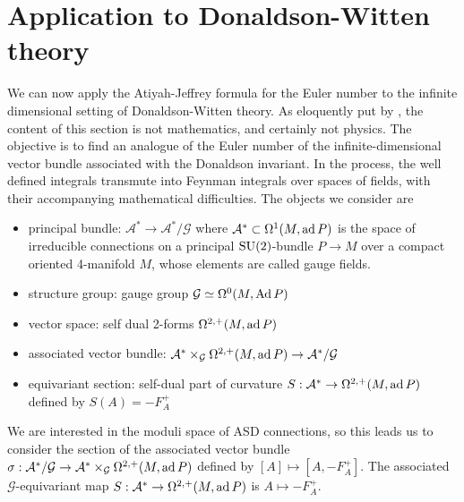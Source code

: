 \section{Application to Donaldson-Witten theory}
We can now apply the Atiyah-Jeffrey formula for the Euler number to the infinite 
dimensional setting of Donaldson-Witten theory. As eloquently put by \citet{naber},
the content of this section is not mathematics, and certainly not physics. The
objective is to find an analogue of the Euler number of the
infinite-dimensional vector bundle associated with the Donaldson invariant. In
the process, the well defined integrals transmute into Feynman integrals
over spaces of fields, with their accompanying mathematical difficulties.  
The objects we consider are 
\begin{itemize}
	\item principal bundle: $\mathcal{A}^* \to \mathcal{A}^* /\mathcal{G}$ where 
	$\mathcal{A}^* \subset \Omega^1(M,\operatorname{ad} P)$ is the
	space of irreducible connections   on a principal $\operatorname{SU}(2)$-bundle  $P\to M$
	over a compact oriented 4-manifold $M$, whose elements are called gauge
	fields.
	\item structure group: gauge group $\mathcal{G}\simeq \Omega^0(M,\operatorname{Ad} P)$
	\item vector space: self dual 2-forms $\Omega^{2,+}(M,\operatorname{ad} P)$ 
	\item associated vector bundle: $\mathcal{A}^* \times_\mathcal{G}
		\Omega^{2,+}(M,\operatorname{ad} P)  \to \mathcal{A}^* /\mathcal{G}$
	\item equivariant section: self-dual part of curvature $S : \mathcal{A}^* \to
		\Omega^{2,+}(M,\operatorname{ad} P)$ defined by $S(A)=-F_A^+$
\end{itemize}

We are interested in the moduli space of ASD connections, so this leads us to
consider the section of the associated vector bundle 
$\sigma : \mathcal{A}^* /\mathcal{G} \to \mathcal{A}^*\times_\mathcal{G}
\Omega^{2,+}(M,\operatorname{ad} P)$ defined by $[A]\mapsto [A,-F_A^+]$. 
The associated $\mathcal{G}$-equivariant map $S : \mathcal{A}^* \to
\Omega^{2,+}(M,\operatorname{ad} P)$ is $A \mapsto -F_A^+$.

